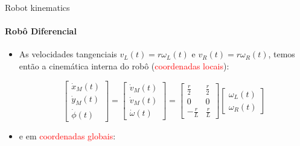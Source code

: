 \documentclass[aspectratio=169]{beamer}
\begin{document}
\begin{frame}{Robot kinematics}
    \framesubtitle{Robô Diferencial}
    \begin{itemize}
        \item As velocidades tangenciais $v_L(t)=r\omega_L(t)$ e $v_R(t)=r\omega_R(t)$, temos então a cinemática interna do robô (\textcolor{red}{coordenadas locais}):

              \begin{equation*}
                  \boxed{
                      \begin{bmatrix}
                          \dot{x}_M(t) \\
                          \dot{y}_M(t) \\
                          \dot{\phi}(t)
                      \end{bmatrix}
                      =
                      \begin{bmatrix}
                          \dot{v}_M(t) \\
                          \dot{v}_M(t) \\
                          \dot{\omega}(t)
                      \end{bmatrix}
                      =
                      \begin{bmatrix}
                          \frac{r}{2}  & \frac{r}{2} \\
                          0            & 0           \\
                          -\frac{r}{L} & \frac{r}{L}
                      \end{bmatrix}
                      \begin{bmatrix}
                          \omega_L(t) \\
                          \omega_R(t)
                      \end{bmatrix}}
              \end{equation*}

        \item e em \textcolor{red}{coordenadas globais}:


\end{itemize}
\end{frame}
\end{document}
